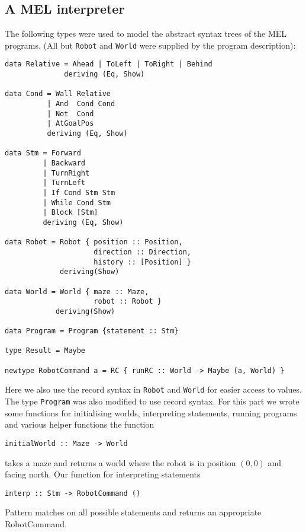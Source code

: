 \documentclass[a4paper,10pt]{article}
\begin{document}
\subsection{A MEL interpreter}

The following types were used to model the abstract syntax trees of the MEL programs. (All but \verb=Robot= and \verb=World= were supplied by the program description):
\begin{verbatim}
data Relative = Ahead | ToLeft | ToRight | Behind
              deriving (Eq, Show)

data Cond = Wall Relative
          | And  Cond Cond
          | Not  Cond
          | AtGoalPos
          deriving (Eq, Show)
            
data Stm = Forward
         | Backward
         | TurnRight
         | TurnLeft    
         | If Cond Stm Stm
         | While Cond Stm
         | Block [Stm]
         deriving (Eq, Show)

data Robot = Robot { position :: Position,
                     direction :: Direction,
                     history :: [Position] }
             deriving(Show)
             
data World = World { maze :: Maze,
                     robot :: Robot }
            deriving(Show)

data Program = Program {statement :: Stm}

type Result = Maybe

newtype RobotCommand a = RC { runRC :: World -> Maybe (a, World) }
\end{verbatim}
Here we also use the record syntax in \verb=Robot= and \verb=World= for easier access to values. The type \verb=Program= was also modified to use record syntax.
For this part we wrote some functions for initialising worlds, interpreting statements, running programs and various helper functions the function
\begin{verbatim}
initialWorld :: Maze -> World
\end{verbatim}
takes a maze and returns a world where the robot is in position $(0,0)$ and facing north. Our function for interpreting statements
\begin{verbatim}
interp :: Stm -> RobotCommand ()
\end{verbatim}
Pattern matches on all possible statements and returns an appropriate RobotCommand.
\end{document}
